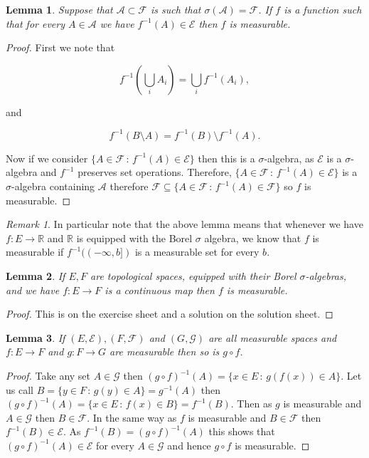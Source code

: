 \documentclass[
]{book}
\newtheorem{lemma}{Lemma}[chapter]
\theoremstyle{definition}
\theoremstyle{definition}
\theoremstyle{definition}
\theoremstyle{definition}
\theoremstyle{remark}
\newtheorem*{remark}{Remark}
\begin{document}
\begin{lemma}
Suppose that \(\mathcal{A} \subset \mathcal{F}\) is such that \(\sigma(\mathcal{A})= \mathcal{F}\). If \(f\) is a function such that for every \(A \in \mathcal{A}\) we have \(f^{-1}(A) \in \mathcal{E}\) then \(f\) is measurable.
\end{lemma}

\begin{proof}
First we note that

\[ f^{-1}\left( \bigcup_i A_i \right) = \bigcup_i f^{-1}(A_i), \]

and

\[ f^{-1}(B \setminus A) = f^{-1}(B) \setminus f^{-1}(A). \]

Now if we consider \(\{ A \in \mathcal{F} \, :\, f^{-1}(A) \in \mathcal{E}\}\) then this is a \(\sigma\)-algebra, as \(\mathcal{E}\) is a \(\sigma\)-algebra and \(f^{-1}\) preserves set operations. Therefore, \(\{ A \in \mathcal{F} \, :\, f^{-1}(A) \in \mathcal{E}\}\) is a \(\sigma\)-algebra containing \(\mathcal{A}\) therefore \(\mathcal{F} \subseteq \{ A \in \mathcal{F} \, :\, f^{-1}(A) \in \mathcal{F}\}\) so \(f\) is measurable.
\end{proof}

\begin{remark}
In particular note that the above lemma means that whenever we have \(f: E \rightarrow \mathbb{R}\) and \(\mathbb{R}\) is equipped with the Borel \(\sigma\) algebra, we know that \(f\) is measurable if \(f^{-1}((-\infty, b])\) is a measurable set for every \(b\).
\end{remark}

\begin{lemma}
If \(E, F\) are topological spaces, equipped with their Borel \(\sigma\)-algebras, and we have \(f:E \rightarrow F\) is a continuous map then \(f\) is measurable.
\end{lemma}

\begin{proof}
This is on the exercise sheet and a solution on the solution sheet.
\end{proof}

\begin{lemma}
If \((E, \mathcal{E}), (F, \mathcal{F})\) and \((G, \mathcal{G})\) are all measurable spaces and \(f : E \rightarrow F\) and \(g: F \rightarrow G\) are measurable then so is \(g \circ f\).
\end{lemma}

\begin{proof}
Take any set \(A \in \mathcal{G}\) then \((g\circ f)^{-1}(A) = \{ x \in E \,:\, g(f(x)) \in A\}\). Let us call \(B = \{y \in F \,:\, g(y) \in A\} = g^{-1}(A)\) then \((g \circ f)^{-1}(A) = \{ x \in E \,:\, f(x) \in B\} = f^{-1}(B)\). Then as \(g\) is measurable and \(A \in \mathcal{G}\) then \(B \in \mathcal{F}\). In the same way as \(f\) is measurable and \(B \in \mathcal{F}\) then \(f^{-1}(B) \in \mathcal{E}\). As \(f^{-1}(B) = (g \circ f)^{-1}(A)\) this shows that \((g \circ f)^{-1}(A) \in \mathcal{E}\) for every \(A \in \mathcal{G}\) and hence \(g \circ f\) is measurable.
\end{proof}
\end{document}
